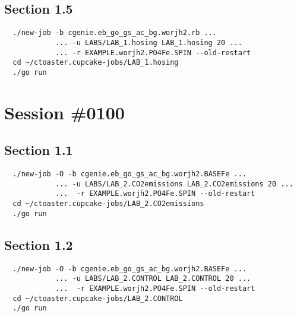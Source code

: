 \documentclass[a4paper,10pt,article]{memoir}
\begin{document}
\subsection*{Section 1.5}

\begin{verbatim}
  ./new-job -b cgenie.eb_go_gs_ac_bg.worjh2.rb ...
            ... -u LABS/LAB_1.hosing LAB_1.hosing 20 ...
            ... -r EXAMPLE.worjh2.PO4Fe.SPIN --old-restart
  cd ~/ctoaster.cupcake-jobs/LAB_1.hosing
  ./go run
\end{verbatim}

\section{Session \#0100}

\subsection*{Section 1.1}

\begin{verbatim}
  ./new-job -O -b cgenie.eb_go_gs_ac_bg.worjh2.BASEFe ...
            ... -u LABS/LAB_2.CO2emissions LAB_2.CO2emissions 20 ...
            ...  -r EXAMPLE.worjh2.PO4Fe.SPIN --old-restart
  cd ~/ctoaster.cupcake-jobs/LAB_2.CO2emissions
  ./go run
\end{verbatim}

\subsection*{Section 1.2}

\begin{verbatim}
  ./new-job -O -b cgenie.eb_go_gs_ac_bg.worjh2.BASEFe ...
            ... -u LABS/LAB_2.CONTROL LAB_2.CONTROL 20 ...
            ...  -r EXAMPLE.worjh2.PO4Fe.SPIN --old-restart
  cd ~/ctoaster.cupcake-jobs/LAB_2.CONTROL
  ./go run
\end{verbatim}
\end{document}
